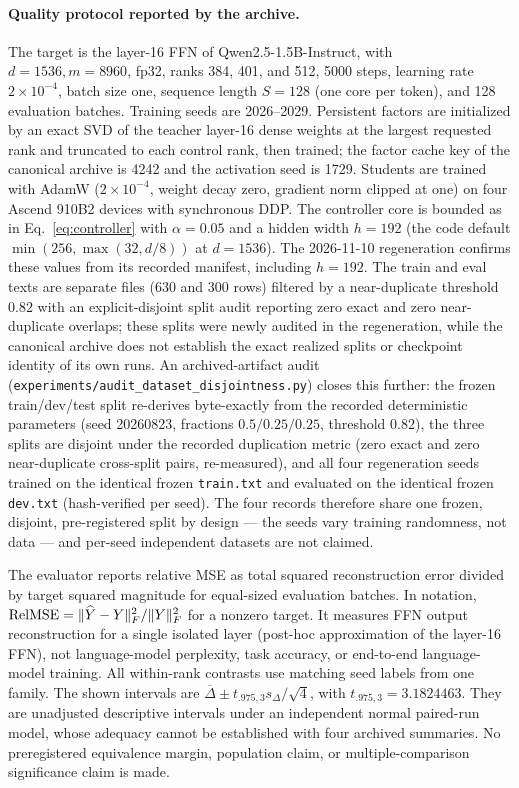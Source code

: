 \paragraph{Quality protocol reported by the archive.}
The target is the layer-16 FFN of Qwen2.5-1.5B-Instruct, with $d=1536,m=8960$,
fp32, ranks 384, 401, and 512, 5000 steps, learning rate $2\times10^{-4}$,
batch size one, sequence length $S=128$ (one core per token), and 128
evaluation batches. Training seeds are 2026--2029. Persistent factors are
initialized by an exact SVD of the teacher layer-16 dense weights at the
largest requested rank and truncated to each control rank, then trained; the
factor cache key of the canonical archive is 4242 and the activation seed is
1729. Students are trained with AdamW ($2\times10^{-4}$, weight decay zero,
gradient norm clipped at one) on four Ascend 910B2 devices with synchronous
DDP. The controller core is bounded as in Eq.~\eqref{eq:controller} with
$\alpha=0.05$ and a hidden width $h=192$ (the code default
$\min(256,\max(32,d/8))$ at $d=1536$). The 2026-11-10 regeneration confirms
these values from its recorded manifest, including $h=192$. The train and
eval texts are separate files (630 and 300 rows) filtered by a
near-duplicate threshold $0.82$ with an explicit-disjoint split audit reporting
zero exact and zero near-duplicate overlaps; these splits were newly audited
in the regeneration, while the canonical archive does not establish the exact
realized splits or checkpoint identity of its own runs. An archived-artifact
audit (\texttt{experiments/audit\_dataset\_disjointness.py}) closes this
further: the frozen train/dev/test split re-derives byte-exactly from the
recorded deterministic parameters (seed 20260823, fractions $0.5/0.25/0.25$,
threshold $0.82$), the three splits are disjoint under the recorded
duplication metric (zero exact and zero near-duplicate cross-split pairs,
re-measured), and all four regeneration seeds trained on the identical
frozen \texttt{train.txt} and evaluated on the identical frozen
\texttt{dev.txt} (hash-verified per seed). The four records therefore share
one frozen, disjoint, pre-registered split by design --- the seeds vary
training randomness, not data --- and per-seed independent datasets are
not claimed.

The evaluator reports relative MSE as total squared reconstruction error divided
by target squared magnitude for equal-sized evaluation batches. In notation,
$\mathrm{RelMSE}=\lVert \widehat Y-Y\rVert_F^2/\lVert Y\rVert_F^2$ for a nonzero target.
It measures FFN output reconstruction for a single isolated layer
(post-hoc approximation of the layer-16 FFN), not language-model perplexity,
task accuracy, or end-to-end language-model training. All within-rank
contrasts use matching seed labels from one family.
The shown intervals are $\overline\Delta\pm t_{.975,3}s_\Delta/\sqrt4$,
with $t_{.975,3}=3.1824463$. They are unadjusted descriptive intervals under an
independent normal paired-run model, whose adequacy cannot be established with
four archived summaries. No preregistered equivalence margin, population
claim, or multiple-comparison significance claim is made.

